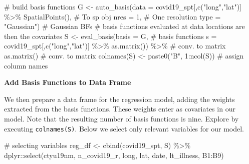 \documentclass[
  letterpaper,
  DIV=11,
  numbers=noendperiod,
  oneside]{scrreprt}
\newenvironment{Shaded}{\begin{snugshade}}{\end{snugshade}}
\newcommand{\AttributeTok}[1]{\textcolor[rgb]{0.40,0.45,0.13}{#1}}
\newcommand{\CommentTok}[1]{\textcolor[rgb]{0.37,0.37,0.37}{#1}}
\newcommand{\DecValTok}[1]{\textcolor[rgb]{0.68,0.00,0.00}{#1}}
\newcommand{\FunctionTok}[1]{\textcolor[rgb]{0.28,0.35,0.67}{#1}}
\newcommand{\NormalTok}[1]{\textcolor[rgb]{0.00,0.23,0.31}{#1}}
\newcommand{\OtherTok}[1]{\textcolor[rgb]{0.00,0.23,0.31}{#1}}
\newcommand{\SpecialCharTok}[1]{\textcolor[rgb]{0.37,0.37,0.37}{#1}}
\newcommand{\StringTok}[1]{\textcolor[rgb]{0.13,0.47,0.30}{#1}}
\begin{document}
\begin{Shaded}
\begin{Highlighting}[]
\CommentTok{\# build basis functions}
\NormalTok{G }\OtherTok{\textless{}{-}} \FunctionTok{auto\_basis}\NormalTok{(}\AttributeTok{data =}\NormalTok{ covid19\_spt[,}\FunctionTok{c}\NormalTok{(}\StringTok{"long"}\NormalTok{,}\StringTok{"lat"}\NormalTok{)] }\SpecialCharTok{\%\textgreater{}\%}
                       \FunctionTok{SpatialPoints}\NormalTok{(),           }\CommentTok{\# To sp obj}
                \AttributeTok{nres =} \DecValTok{1}\NormalTok{,                         }\CommentTok{\# One resolution}
                \AttributeTok{type =} \StringTok{"Gaussian"}\NormalTok{)                }\CommentTok{\# Gaussian BFs}
\CommentTok{\# basis functions evaluated at data locations are then the covariates}
\NormalTok{S }\OtherTok{\textless{}{-}} \FunctionTok{eval\_basis}\NormalTok{(}\AttributeTok{basis =}\NormalTok{ G,                       }\CommentTok{\# basis functions}
                \AttributeTok{s =}\NormalTok{ covid19\_spt[,}\FunctionTok{c}\NormalTok{(}\StringTok{"long"}\NormalTok{,}\StringTok{"lat"}\NormalTok{)] }\SpecialCharTok{\%\textgreater{}\%}
                     \FunctionTok{as.matrix}\NormalTok{()) }\SpecialCharTok{\%\textgreater{}\%}            \CommentTok{\# conv. to matrix}
     \FunctionTok{as.matrix}\NormalTok{()                                 }\CommentTok{\# conv. to matrix}
\FunctionTok{colnames}\NormalTok{(S) }\OtherTok{\textless{}{-}} \FunctionTok{paste0}\NormalTok{(}\StringTok{"B"}\NormalTok{, }\DecValTok{1}\SpecialCharTok{:}\FunctionTok{ncol}\NormalTok{(S)) }\CommentTok{\# assign column names}
\end{Highlighting}
\end{Shaded}

\textbf{Add Basis Functions to Data Frame}

We then prepare a data frame for the regression model, adding the
weights extracted from the basis functions. These weights enter as
covariates in our model. Note that the resulting number of basis
functions is nine. Explore by executing \texttt{colnames(S)}. Below we
select only relevant variables for our model.

\begin{Shaded}
\begin{Highlighting}[]
\CommentTok{\# selecting variables}
\NormalTok{reg\_df }\OtherTok{\textless{}{-}} \FunctionTok{cbind}\NormalTok{(covid19\_spt, S) }\SpecialCharTok{\%\textgreater{}\%}
\NormalTok{  dplyr}\SpecialCharTok{::}\FunctionTok{select}\NormalTok{(ctyu19nm, n\_covid19\_r, long, lat, date, lt\_illness, B1}\SpecialCharTok{:}\NormalTok{B9)}
\end{Highlighting}
\end{Shaded}
\end{document}
